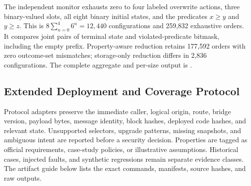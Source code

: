 The independent monitor exhausts zero to four labeled overwrite actions, three
binary-valued slots, all eight binary initial states, and the predicates
$x\geq y$ and $y\geq z$. This is
$8\sum_{n=0}^{4}6^n=12{,}440$ configurations and 259,832 exhaustive orders.
It compares joint pairs of terminal state and violated-predicate bitmask,
including the empty prefix. Property-aware reduction retains 177,592 orders
with zero outcome-set mismatches; storage-only reduction differs in 2,836
configurations. The complete aggregate and per-size output is
.

\subsection{Extended Deployment and Coverage Protocol}
Protocol adapters preserve the immediate caller, logical origin, route,
bridge version, payload bytes, message identity, block hashes, deployed code
hashes, and relevant state. Unsupported selectors, upgrade patterns, missing
snapshots, and ambiguous intent are reported before a security decision.
Properties are tagged as official requirements, case-study policies, or
illustrative assumptions. Historical cases, injected faults, and synthetic
regressions remain separate evidence classes. The artifact guide below lists
the exact commands, manifests, source hashes, and raw outputs.
